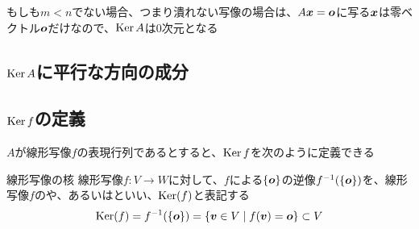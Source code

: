 \documentclass[../../../topic_linear-algebra]{subfiles}
\begin{document}
もしも$m < n$でない場合、つまり潰れない写像の場合は、$A\vb*{x} = \vb*{o}$に写る$\vb*{x}$は零ベクトル$\vb*{o}$だけなので、$\operatorname{Ker} A$は0次元となる

\subsection{$\operatorname{Ker} A$に平行な方向の成分}


\subsection{$\operatorname{Ker} f$の定義}

$A$が線形写像$f$の表現行列であるとすると、$\operatorname{Ker} f$を次のように定義できる

\begin{definition*}{線形写像の核}
  線形写像$f\colon V \to W$に対して、$f$による$\{\vb*{o}\}$の逆像$f^{-1}(\{\vb*{o}\})$を、線形写像$f$のや、あるいはといい、$\operatorname{Ker}(f)$と表記する
  \begin{equation*}
    \operatorname{Ker}(f) = f^{-1}(\{\vb*{o}\}) = \{ \vb*{v} \in V \mid f(\vb*{v}) = \vb*{o} \} \subset V
  \end{equation*}
\end{definition*}
\end{document}
